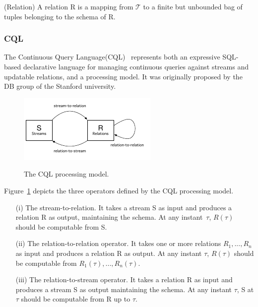 \begin{Definition}
(Relation) A relation R is a mapping from $\mathcal{T}$ to a finite but unbounded bag of tuples belonging to the schema of R.
\end{Definition}
 
\subsubsection{CQL}\label{sec:CQL}
The Continuous Query Language(CQL)~\cite{arasu2006cql} represents both an expressive SQL-based declarative language for managing continuous queries against streams and updatable relations, and a processing model. 
It was originally proposed by the DB group of the Stanford university.

\begin{figure}[h]
  \begin{center}
    \includegraphics[width=.65\textwidth]{img/cql-model}\\
    \caption{The CQL processing model.}
    \label{fig:cql-model}
  \end{center}
\end{figure}

Figure~\ref{fig:cql-model} depicts the three operators defined by the CQL processing model. 
\begin{itemize}
\item[(i)] The stream-to-relation. It takes a stream S as input and produces a relation R as output, maintaining the schema. At any instant~$\tau$, $R(\tau)$ should be computable from S.
\item[(ii)] The relation-to-relation operator. It takes one or more relations $R_1,... , R_n$ as input and produces a relation R as output. At any instant $\tau$, $R(\tau)$ should be computable from $R_1(\tau),... , R_n(\tau)$.
\item[(iii)] The relation-to-stream operator. It takes a relation R as input and produces a stream S as output maintaining the schema. At any instant $\tau$, S at $\tau$ should be computable from R up to $\tau$.
\end{itemize}

